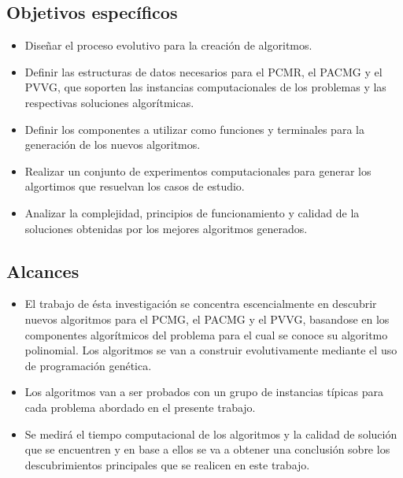 \subsection{Objetivos específicos}
\begin{itemize}

    \item Diseñar el proceso evolutivo para la creación de algoritmos.
   
    \item Definir las estructuras de datos necesarios para el PCMR, el PACMG y el PVVG, que soporten las instancias computacionales de los problemas y las respectivas soluciones algorítmicas.
    
    \item Definir los componentes a utilizar como funciones y terminales para la generación de los nuevos algoritmos.
    
    \item Realizar un conjunto de experimentos computacionales para generar los algortimos que resuelvan los casos de estudio.
    
    \item Analizar la complejidad, principios de funcionamiento y calidad de la soluciones obtenidas por los mejores algoritmos generados.
    
\end{itemize}


\subsection{Alcances}

\begin{itemize}

    \item El trabajo de ésta investigación se concentra escencialmente en descubrir nuevos algoritmos para el PCMG, el PACMG  y el PVVG, basandose en los componentes algorítmicos del problema para el cual se conoce su algoritmo polinomial. Los algoritmos se van a construir evolutivamente mediante el uso de programación genética.
    
    \item Los algoritmos van a ser probados con un grupo de instancias típicas para cada problema abordado en el presente trabajo.
    
     \item Se medirá el tiempo computacional de los algoritmos y la calidad de solución que se encuentren y en base a ellos se va a obtener una conclusión sobre los descubrimientos principales que se realicen en este trabajo.
    
  \end{itemize}  
   


